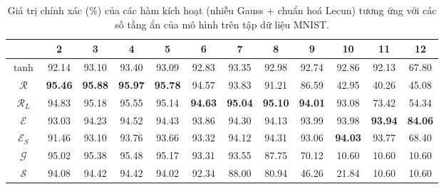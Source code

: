 \begin{table}[ht!]
\centering
\def\arraystretch{1.1}
\begin{tabular}{c|c|c|c|c|c|c|c|c|c|c|c|}
\cline{2-12}
                        & 2     & 3     & 4     & 5     & 6     & 7     & 8     & 9     & 10    & 11    & 12    \\ \hline
\multicolumn{1}{|c|}{$\tanh$} & 92.14 & 93.10 & 93.40 & 93.09 & 92.83 & 93.35 & 92.98 & 92.74 & 92.86 & 92.13 & 67.80 \\ \hline
\multicolumn{1}{|c|}{$\mathcal{R}$} & \textbf{95.46} & \textbf{95.88} & \textbf{95.97} & \textbf{95.78} & 94.57 & 93.83 & 91.21 & 86.59 & 42.95 & 40.26 & 45.08 \\ \hline
\multicolumn{1}{|c|}{$\mathcal{R}_L$} & 94.83 & 95.18 & 95.55 & 95.14 & \textbf{94.63} & \textbf{95.04} & \textbf{95.10} & \textbf{94.01} & 93.08 & 73.42 & 54.34 \\ \hline
\multicolumn{1}{|c|}{$\mathcal{E}$} & 93.03 & 94.23 & 94.52 & 94.43 & 93.86 & 94.30 & 94.13 & 93.99 & 93.98 & \textbf{93.94} & \textbf{84.06} \\ \hline
\multicolumn{1}{|c|}{$\mathcal{E}_S$} & 91.46 & 93.10 & 93.76 & 93.66 & 93.32 & 94.12 & 94.31 & 93.06 & \textbf{94.03} & 93.77 & 68.40 \\ \hline
\multicolumn{1}{|c|}{$\mathcal{G}$} & 95.02 & 95.38 & 95.48 & 95.17 & 93.31 & 93.55 & 87.75 & 70.12 & 10.60 & 10.60 & 10.60 \\ \hline
\multicolumn{1}{|c|}{$\mathcal{S}$} & 94.08 & 94.42 & 94.42 & 94.02 & 92.34 & 88.00 & 80.94 & 46.26 & 21.84 & 10.60 & 10.60 \\ \hline
\end{tabular}
\caption{Giá trị chính xác (\%) của các hàm kích hoạt (nhiễu Gauss + chuẩn hoá Lecun) tương ứng với các số tầng ẩn của mô hình trên tập dữ liệu MNIST.}
\label{tab:mnistnoiseacc}
\end{table}

